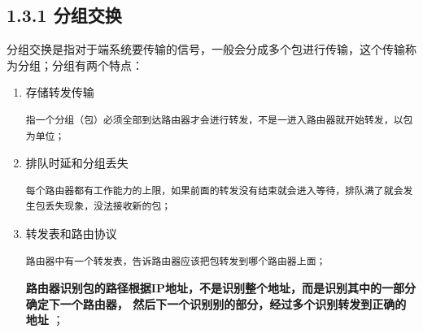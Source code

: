 \documentclass[11pt]{article}
\begin{document}
\subsection{1.3.1 分组交换}
\label{sec:org789189c}
分组交换是指对于端系统要传输的信号，一般会分成多个包进行传输，这个传输称为分组；分组有两个特点：
\begin{enumerate}
\item 存储转发传输
\begin{verbatim}
指一个分组（包）必须全部到达路由器才会进行转发，不是一进入路由器就开始转发，以包为单位；
\end{verbatim}
\item 排队时延和分组丢失
\begin{verbatim}
每个路由器都有工作能力的上限，如果前面的转发没有结束就会进入等待，排队满了就会发生包丢失现象，没法接收新的包；
\end{verbatim}
\item 转发表和路由协议
\begin{verbatim}
路由器中有一个转发表，告诉路由器应该把包转发到哪个路由器上面；
\end{verbatim}

\textbf{路由器识别包的路径根据IP地址，不是识别整个地址，而是识别其中的一部分确定下一个路由器，
然后下一个识别别的部分，经过多个识别转发到正确的地址} ；
\end{enumerate}
\end{document}
